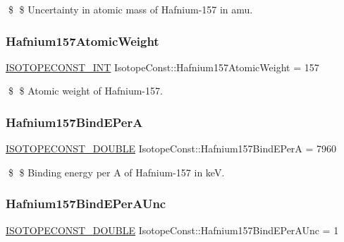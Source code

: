 \$ \$ Uncertainty in atomic mass of Hafnium-\/157 in amu. \mbox{\label{group___isotope_const-_hafnium-_hf157_gaeac79036be25de634ce83c05e13675c1}} 
\subsubsection{\texorpdfstring{Hafnium157\+Atomic\+Weight}{Hafnium157AtomicWeight}}
{\footnotesize\ttfamily \mbox{\hyperlink{group___isotope_const-_macros_ga5f18360b3e99483a35c32d789e62621c}{I\+S\+O\+T\+O\+P\+E\+C\+O\+N\+S\+T\+\_\+\+I\+NT}} Isotope\+Const\+::\+Hafnium157\+Atomic\+Weight = 157}

\$ \$ Atomic weight of Hafnium-\/157. \mbox{\label{group___isotope_const-_hafnium-_hf157_ga2174fbc34a0c6d89a85d1f4e90017909}} 
\subsubsection{\texorpdfstring{Hafnium157\+Bind\+E\+PerA}{Hafnium157BindEPerA}}
{\footnotesize\ttfamily \mbox{\hyperlink{group___isotope_const-_macros_ga8f45a7272ce02c0b4c65c44636ed719a}{I\+S\+O\+T\+O\+P\+E\+C\+O\+N\+S\+T\+\_\+\+D\+O\+U\+B\+LE}} Isotope\+Const\+::\+Hafnium157\+Bind\+E\+PerA = 7960}

\$ \$ Binding energy per A of Hafnium-\/157 in keV. \mbox{\label{group___isotope_const-_hafnium-_hf157_gaa68fea4840a095bd4322d5a6c5daecb4}} 
\subsubsection{\texorpdfstring{Hafnium157\+Bind\+E\+Per\+A\+Unc}{Hafnium157BindEPerAUnc}}
{\footnotesize\ttfamily \mbox{\hyperlink{group___isotope_const-_macros_ga8f45a7272ce02c0b4c65c44636ed719a}{I\+S\+O\+T\+O\+P\+E\+C\+O\+N\+S\+T\+\_\+\+D\+O\+U\+B\+LE}} Isotope\+Const\+::\+Hafnium157\+Bind\+E\+Per\+A\+Unc = 1}

